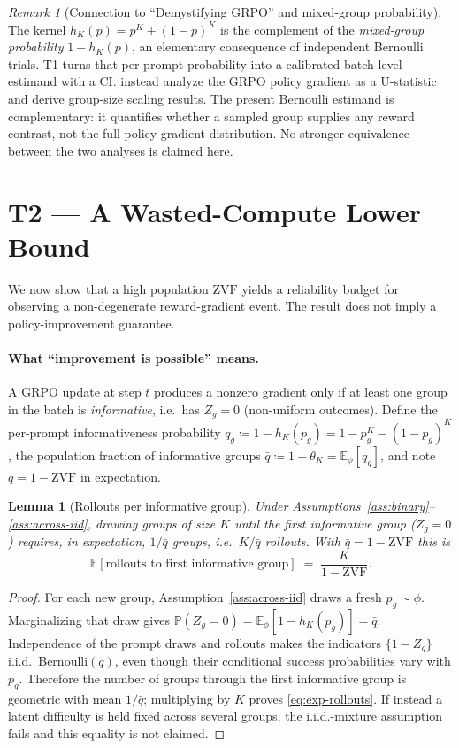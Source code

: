 \documentclass[11pt]{article}
\theoremstyle{plain}
\newtheorem{lemma}{Lemma}
\theoremstyle{definition}
\theoremstyle{remark}
\newtheorem{remark}{Remark}
\newcommand{\ZVF}{\ensuremath{\mathrm{ZVF}}}
\newcommand{\E}{\mathbb{E}}
\newcommand{\Prob}{\mathbb{P}}
\newcommand{\1}{\mathbb{1}}
\begin{document}
\begin{remark}[Connection to ``Demystifying GRPO'' and mixed-group probability]
\label{rem:connections}
The kernel $h_K(p)=p^K+(1-p)^K$ is the complement of the \emph{mixed-group
probability} $1-h_K(p)$, an elementary consequence of independent Bernoulli
trials. T1 turns that per-prompt probability into a calibrated batch-level
estimand with a CI. \citet{zhou2026demystifyinggrpo} instead analyze the GRPO
policy gradient as a U-statistic and derive group-size scaling results. The
present Bernoulli estimand is complementary: it quantifies whether a sampled
group supplies any reward contrast, not the full policy-gradient distribution.
No stronger equivalence between the two analyses is claimed here.
\end{remark}

\section{T2 --- A Wasted-Compute Lower Bound}\label{sec:T2}
We now show that a high population \ZVF{} yields a reliability budget for
observing a non-degenerate reward-gradient event. The result does not imply a
policy-improvement guarantee.

\paragraph{What ``improvement is possible'' means.} A GRPO update at step $t$
produces a nonzero gradient only if at least one group in the batch is
\emph{informative}, i.e.\ has $Z_g=0$ (non-uniform outcomes). Define the
per-prompt informativeness probability $q_g \coloneqq 1-h_K(p_g) =
1-p_g^K-(1-p_g)^K$, the population fraction of informative groups
$\bar q \coloneqq 1-\theta_K = \E_\phi[q_g]$, and note $\bar q = 1 - \ZVF$ in
expectation.

\begin{lemma}[Rollouts per informative group]\label{lem:rollouts-per-group}
Under Assumptions~\ref{ass:binary}--\ref{ass:across-iid}, drawing groups of
size $K$ until the first informative group ($Z_g=0$) requires, in expectation,
$1/\bar q$ groups, i.e.\ $K/\bar q$ rollouts. With $\bar q = 1-\ZVF$ this is
\begin{equation}\label{eq:exp-rollouts}
\E[\text{rollouts to first informative group}] \;=\; \frac{K}{1-\ZVF}.
\end{equation}
\end{lemma}
\begin{proof}
For each new group, Assumption~\ref{ass:across-iid} draws a fresh
$p_g\sim\phi$. Marginalizing that draw gives
$\Prob(Z_g=0)=\E_\phi[1-h_K(p_g)]=\bar q$. Independence of the prompt draws and
rollouts makes the indicators $\{1-Z_g\}$ i.i.d.\ Bernoulli$(\bar q)$, even
though their conditional success probabilities vary with $p_g$. Therefore the
number of groups through the first informative group is geometric with mean
$1/\bar q$; multiplying by $K$ proves \eqref{eq:exp-rollouts}. If instead a
latent difficulty is held fixed across several groups, the i.i.d.-mixture
assumption fails and this equality is not claimed.
\end{proof}
\end{document}
